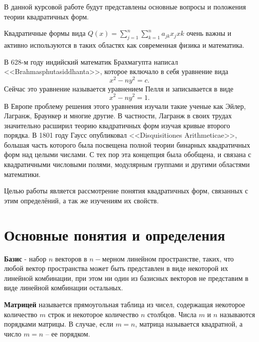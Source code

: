 \documentclass[bachelor, och, coursework, times]{SCWorks}
\author{Sharov Alex}
\newcommand{\udsum}[3]{\sum\limits_{#1}^{#2}{#3}}
\begin{document}

\patitle{} 
\paname{}
\term{} 
\practStart{}  
\practFinish{} 
\MakeTitle

\setcounter{tocdepth}{1}

\tableofcontents

\intro
В данной курсовой работе будут представлены основные вопросы и положения теории квадратичных форм.

Квадратичные формы вида $Q(x)=\udsum{j=1}{n}{}\udsum{k=1}{n}{a_{jk}x_{j}x{k}}$ очень важны и активно используются в таких областях как современная физика и математика.

В 628-м году индийский математик Брахмагупта написал \\ <<Brahmasphutasiddhanta>>, которое включало в себя уравнение вида $$x^2-ny^2=c.$$ Сейчас это уравнение называется уравнением Пелля и записывается в виде $$x^2-ny^2=1.$$ В Европе проблему решения этого уравнения изучали такие ученые как Эйлер, Лагранж, Браункер и многие другие. В частности, Лагранж в своих трудах значительно расширил теорию квадратичных форм изучая кривые второго порядка. В 1801 году Гаусс опубликовал <<Disquisitiones Arithmeticae>>, большая часть которого была посвещена  полной теории бинарных квадратичных форм над целыми числами. С тех пор эта концепция была обобщена, и связана с квадратичными числовыми полями, модулярным группами и другими областями математики.

Целью работы является рассмотрение понятия квадратичных форм, связанных с этим определёний, а так же изучениям их  свойств. 

\section{Основные понятия и определения}

\textbf{Базис} - набор $n$ векторов в $n-$мерном линейном пространстве, таких, что любой вектор пространства может быть представлен в виде некоторой их линейной комбинации, при этом ни один из базисных векторов не представим в виде линейной комбинации остальных. \cite{8}

\textbf{Матрицей} называется прямоугольная таблица из чисел, содержащая некоторое количество $m$ строк и некоторое количество $n$ столбцов. Числа $m$ и $n$ называются порядками матрицы. В случае, если $m = n$, матрица называется квадратной, а число $m= n$ – ее порядком. \cite{9}
\end{document}
